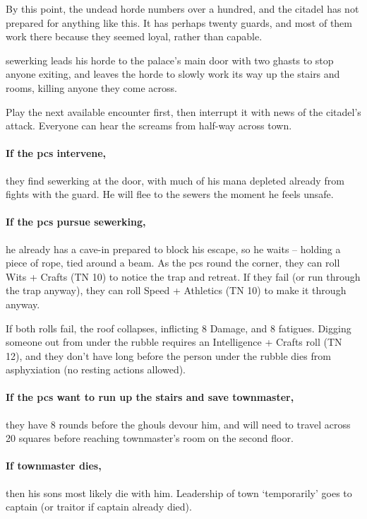 By this point, the undead horde numbers over a hundred, and the citadel has not prepared for anything like this.
It has perhaps twenty guards, and most of them work there because they seemed loyal, rather than capable.

\Gls{sewerking} leads his horde to the palace's main door with two ghasts to stop anyone exiting, and leaves the horde to slowly work its way up the stairs and rooms, killing anyone they come across.

Play the next available encounter first, then interrupt it with news of the citadel's attack.
Everyone can hear the screams from half-way across \gls{town}.

\paragraph{If the \glspl{pc} intervene,}
they find \gls{sewerking} at the door, with much of his mana depleted already from fights with the guard.
He will flee to the sewers the moment he feels unsafe.

\ghast

\ghast

\sewerking


\paragraph{If the \glspl{pc} pursue \gls{sewerking},}
he already has a cave-in prepared to block his escape, so he waits -- holding a piece of rope, tied around a beam.
As the \glspl{pc} round the corner, they can roll Wits + Crafts (TN 10) to notice the trap and retreat.
If they fail (or run through the trap anyway), they can roll Speed + Athletics (TN 10) to make it through anyway.

If both rolls fail, the roof collapses, inflicting 8 Damage, and 8 \glspl{fatigue}.
Digging someone out from under the rubble requires an Intelligence + Crafts roll (TN 12), and they don't have long before the person under the rubble dies from asphyxiation (no resting actions allowed).

\paragraph{If the \glspl{pc} want to run up the stairs and save \gls{townmaster},}
they have 8 rounds before the ghouls devour him, and will need to travel across 20 squares before reaching \gls{townmaster}'s room on the second floor.

\paragraph{If \gls{townmaster} dies,}
then his sons most likely die with him.
Leadership of \gls{town} `temporarily' goes to \Gls{captain} (or \gls{traitor} if \gls{captain} already died).

\stopcontents[sq]
